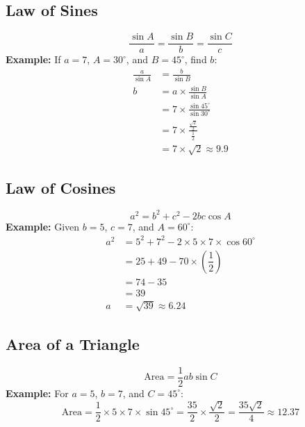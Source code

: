 \documentclass{article}
\begin{document}
\begin{multicols}{2}
\subsection*{Law of Sines}
\begin{center}
\end{center}
\[
\frac{\sin A}{a} = \frac{\sin B}{b} = \frac{\sin C}{c}
\]
\textbf{Example:} If \( a = 7 \), \( A = 30^\circ \), and \( B = 45^\circ \), find \( b \):
\begin{align*}
\frac{a}{\sin A} &= \frac{b}{\sin B} \\
b &= a \times \frac{\sin B}{\sin A} \\
&= 7 \times \frac{\sin 45^\circ}{\sin 30^\circ} \\
&= 7 \times \frac{\frac{\sqrt{2}}{2}}{\frac{1}{2}} \\
&= 7 \times \sqrt{2} \approx 9.9
\end{align*}

\subsection*{Law of Cosines}
\[
a^2 = b^2 + c^2 - 2bc \cos A
\]
\textbf{Example:} Given \( b = 5 \), \( c = 7 \), and \( A = 60^\circ \):
\begin{align*}
a^2 &= 5^2 + 7^2 - 2 \times 5 \times 7 \times \cos 60^\circ \\
&= 25 + 49 - 70 \times \left( \dfrac{1}{2} \right) \\
&= 74 - 35 \\
&= 39 \\
a &= \sqrt{39} \approx 6.24
\end{align*}

\subsection*{Area of a Triangle}
\[
\text{Area} = \dfrac{1}{2} ab \sin C
\]
\textbf{Example:} For \( a = 5 \), \( b = 7 \), and \( C = 45^\circ \):
\[
\text{Area} = \dfrac{1}{2} \times 5 \times 7 \times \sin 45^\circ = \dfrac{35}{2} \times \dfrac{\sqrt{2}}{2} = \dfrac{35\sqrt{2}}{4} \approx 12.37
\]

\end{multicols}
\end{document}
